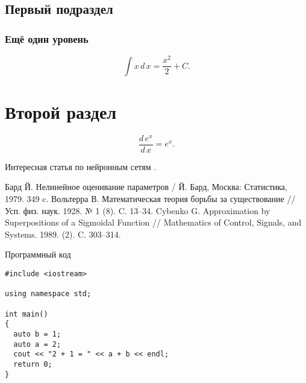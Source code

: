 \documentclass{bacgost}
\begin{document}
\subsection{Первый подраздел}

\subsubsection{Ещё один уровень}
\[
\int x\,d\,x = \dfrac{x^2}{2} + C.
\]

\section{Второй раздел}
\[
\dfrac{d\,e^x}{d\,x} = e^x.
\]

Интересная статья по нейронным сетям \cite{Cybenko}.


\begin{gostbibliography}{11}
 Бард Й. Нелинейное оценивание параметров / Й. Бард, Москва: Статистика, 1979. 349 c.
 Вольтерра В. Математическая теория борьбы за существование // Усп. физ. наук. 1928. № 1 (8). C. 13–34.
 Cybenko G. Approximation by Superpositions of a Sigmoidal Function // Mathematics of Control, Signals, and Systems. 1989. (2). C. 303–314.
\end{gostbibliography}

\appendixes

\begin{gostappendix}{Программный код}
\lstset{language=[11]c++,basicstyle=\ttfamily, showstringspaces=false}

\begin{lstlisting}
#include <iostream>

using namespace std;

int main()
{
  auto b = 1;
  auto a = 2;
  cout << "2 + 1 = " << a + b << endl;
  return 0;
}
\end{lstlisting}
\end{gostappendix}
\end{document}
